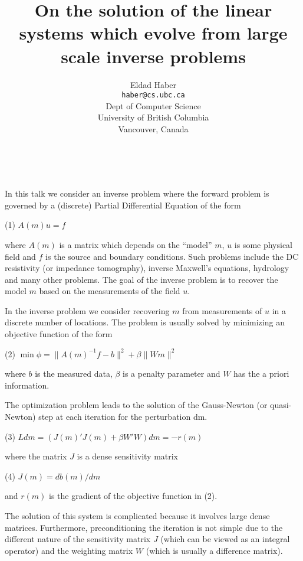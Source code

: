 \documentclass{article}
\date{ ~ \hspace{-4mm}}
\title{On the solution of the linear systems which evolve from  large scale inverse problems  }
\author{Eldad Haber \\ {\tt haber@cs.ubc.ca} \\ Dept of Computer Science \\ University of British Columbia \\ Vancouver, Canada}
\begin{document}
\maketitle
\thispagestyle{empty}





 
In this talk we consider an inverse problem where the forward
problem is governed by a (discrete) Partial Differential Equation of the
form


 
(1)    $A(m) u = f$



where $A(m)$ is a matrix which depends on the ``model'' $m$, $u$ is some
physical field and $f$ is the source and boundary conditions. 
Such problems include the DC resistivity (or impedance tomography),
inverse Maxwell's equations, hydrology and many other problems.
The goal of the inverse problem is to recover the model $m$
based on the measurements of the field $u$.



In the inverse problem we consider recovering $m$ from
measurements of $u$ in a discrete number
of locations. 
The problem is usually solved by minimizing an objective
function of the form


 
(2)    $\min \phi =  \|A(m)^{-1}f - b \|^2 + \beta \| Wm\|^2$



where $b$ is the measured data, $\beta$ is a penalty parameter
and $W$ has the a priori information.




The optimization problem leads to
the solution of the Gauss-Newton (or quasi-Newton)
step at each iteration for the perturbation dm.



(3)     $Ldm =  (J(m)'J(m) + \beta W'W) dm = -r(m)$



where the matrix $J$ is a dense sensitivity matrix



(4)     $J(m) =  db(m)/dm$



and $r(m)$ is the gradient of the objective function in (2).
 



The solution of this system is complicated because it involves
large dense matrices. Furthermore, preconditioning the iteration
is not simple due to the different nature of the sensitivity matrix
$J$ (which can be viewed as an integral operator)
and the weighting matrix $W$
(which is usually a difference matrix).
\end{document}
